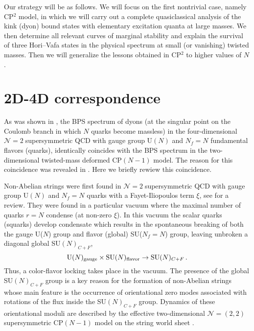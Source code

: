 \documentclass[epsfig,12pt]{article}
\def\beq{\begin{equation}}
\def\eeq{\end{equation}}
\newcommand{\ntwo}{${\mathcal N}=2\;$}
\def\beq{\begin{equation}}
\def\eeq{\end{equation}}
\newcommand{\ntwot}{${\mathcal N}= \left(2,2\right) $ }
\begin{document}
	Our strategy will be as follows. We will focus on the first nontrivial case, namely CP$^2$ model,
	in which we will carry out a complete quasiclassical analysis of the kink (dyon) bound states   with elementary
	excitation quanta at large masses. We then determine all relevant curves of marginal stability and explain the survival of three Hori--Vafa \cite{MR1} states in the physical spectrum at small (or vanishing) twisted masses.
	Then we will generalize the lessons obtained in CP$^2$ to higher values of $N$.


\section{2D-4D correspondence}
\setcounter{equation}{0}
\label{2D4D}

As was shown in \cite{Dorey:1998yh},
the BPS spectrum of dyons (at the singular point on the Coulomb branch 
in which  $N$ quarks become massless) in the
four-dimensional \ntwo supersymmetric QCD with gauge group U$(N)$ and  $N_f=N$ fundamental flavors (quarks), identically
coincides with the BPS spectrum in the two-dimensional twisted-mass deformed CP$(N-1)$ model.
 The reason for this coincidence was revealed 
in \cite{Shifman:2004dr,4}. Here we briefly rewiew this coincidence.

Non-Abelian strings \cite{1,2} were first found in \ntwo supersymmetric QCD with gauge group U$(N)$ and  $N_f=N$ quarks with a Fayet-Iliopoulos term $\xi$, see \cite{Trev,Jrev,SYrev,Trev2} for a review.
 They were found in a 
 particular vacuum where the maximal number of quarks $r=N$ condense (at non-zero $\xi$).
In this vacuum the scalar quarks (squarks) develop condensate which results in  the spontaneous
breaking of both the gauge U($N$) group and flavor (global) SU($N_f=N$) group, leaving unbroken a
  diagonal global SU$(N)_{C+F}$,
\beq
{\rm U}(N)_{\rm gauge}\times {\rm SU}(N)_{\rm flavor}
\to {\rm SU}(N)_{C+F}\,.
\label{c+f}
\eeq
Thus, a color-flavor locking takes place in the vacuum.
The presence of the global SU$(N)_{C+F}$ group is a key reason for the
formation of non-Abelian strings whose main feature is
the occurrence  of orientational zero modes associated with rotations of the flux
inside the  SU$(N)_{C+F}$ group. Dynamics of these orientational moduli are described by
the effective two-dimensional   \ntwot supersymmetric CP$(N-1)$ model on
the string world sheet \cite{1,2,Shifman:2004dr,4}. 
\end{document}
